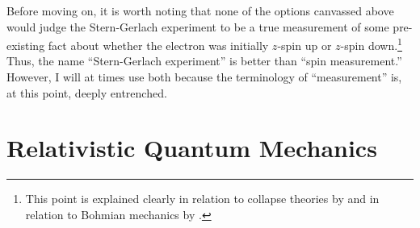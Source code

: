 \documentclass[onecolumn,secnumarabic,amsmath,amssymb,balancelastpage,nofootinbib]{article}
\begin{document}
Before moving on, it is worth noting that none of the options canvassed above would judge the Stern-Gerlach experiment to be a true measurement of some pre-existing fact about whether the electron was initially $z$-spin up or $z$-spin down.\footnote{This point is explained clearly in relation to collapse theories by \citet[pg.\ 101--102]{maudlinQM} and in relation to Bohmian mechanics by \citet{norsen2014}.}  Thus, the name ``Stern-Gerlach experiment'' is better than ``spin measurement.''  However, I will at times use both because the terminology of ``measurement'' is, at this point, deeply entrenched.











\section{Relativistic Quantum Mechanics}\label{rqmsection}
\end{document}
